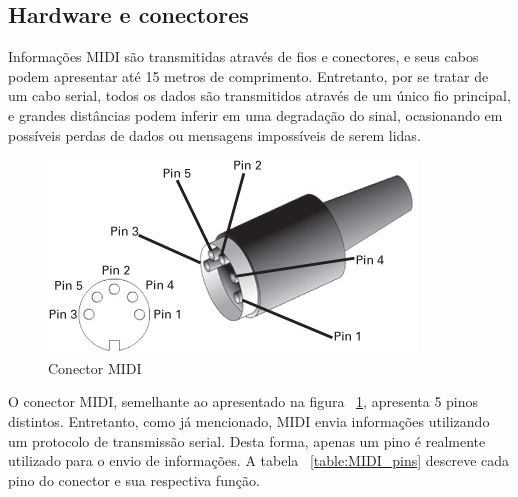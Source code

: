         \subsection{Hardware e conectores}

            Informações MIDI são transmitidas através de fios e conectores, e seus cabos podem apresentar até 15 metros de comprimento. Entretanto, por se tratar de um cabo serial, todos os dados são transmitidos através de um único fio principal, e grandes distâncias podem inferir em uma degradação do sinal, ocasionando em possíveis perdas de dados ou mensagens impossíveis de serem lidas.

            \begin{figure}[H]
            	\centering
            	\includegraphics[scale=0.8]{Imagens/MIDI_connector.jpg}
            	\caption[Conector MIDI]{Conector MIDI}
            	\label{fig:MIDI_connector}
            \end{figure}

            O conector MIDI, semelhante ao apresentado na figura ~\ref{fig:MIDI_connector}, apresenta 5 pinos distintos. Entretanto, como já mencionado, MIDI envia informações utilizando um protocolo de transmissão serial. Desta forma, apenas um pino é realmente utilizado para o envio de informações. A tabela ~\ref{table:MIDI_pins} descreve cada pino do conector e sua respectiva função.

